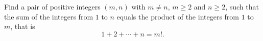 Find a pair of positive integers $(m,n)$ with $m\ne n$, $m\ge2$ and $n\ge2$, such that the sum of the integers from $1$ to $n$ equals the product of the integers from $1$ to $m$, that is
\[1+2+\cdots+n=m!.\]
